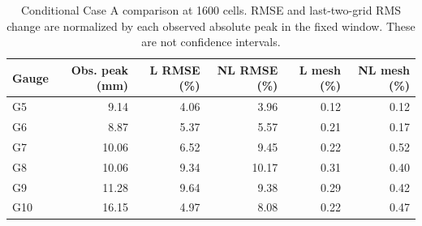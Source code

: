 \begin{table}[htbp]\centering\small
\begin{tabular}{lrrrrr}\toprule
Gauge & Obs. peak (mm) & L RMSE (\%) & NL RMSE (\%) & L mesh (\%) & NL mesh (\%) \\
\midrule
G5 & 9.14 & 4.06 & 3.96 & 0.12 & 0.12 \\
G6 & 8.87 & 5.37 & 5.57 & 0.21 & 0.17 \\
G7 & 10.06 & 6.52 & 9.45 & 0.22 & 0.52 \\
G8 & 10.06 & 9.34 & 10.17 & 0.31 & 0.40 \\
G9 & 11.28 & 9.64 & 9.38 & 0.29 & 0.42 \\
G10 & 16.15 & 4.97 & 8.08 & 0.22 & 0.47 \\
\bottomrule\end{tabular}
\caption{Conditional Case A comparison at 1600 cells. RMSE and last-two-grid RMS change are normalized by each observed absolute peak in the fixed window. These are not confidence intervals.}\end{table}
